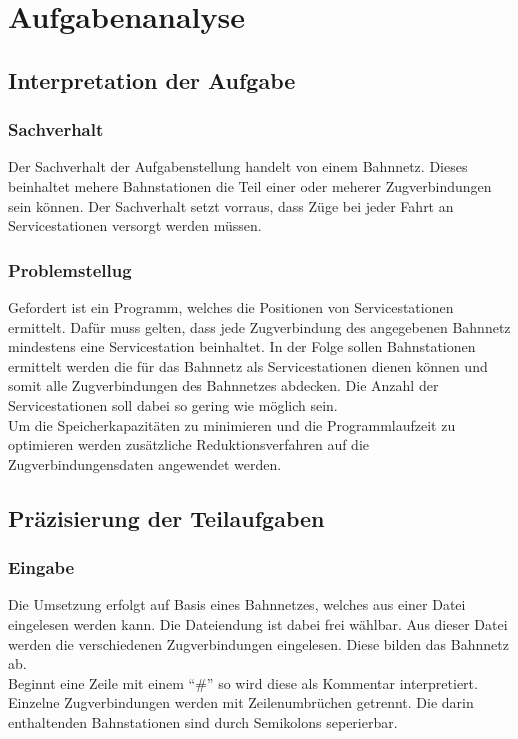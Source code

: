 \chapter{Aufgabenanalyse}\label{ch:aufgabenanalyse}
\section{Interpretation der Aufgabe}\label{auf:sec:interpretation-der-aufgabe}
\subsection{Sachverhalt}\label{auf:subsec:sachverhalt}
Der Sachverhalt der Aufgabenstellung handelt von einem Bahnnetz. Dieses beinhaltet mehere Bahnstationen die Teil einer oder meherer Zugverbindungen sein können. Der Sachverhalt setzt vorraus, dass Züge bei jeder Fahrt an Servicestationen versorgt werden müssen.
\subsection{Problemstellug}\label{auf:subsec:aufgabenstellung}
Gefordert ist ein Programm, welches die Positionen von Servicestationen ermittelt. Dafür muss gelten, dass jede Zugverbindung des angegebenen Bahnnetz mindestens eine Servicestation beinhaltet. In der Folge sollen Bahnstationen ermittelt werden die für das Bahnnetz als Servicestationen dienen können und somit alle Zugverbindungen des Bahnnetzes abdecken. Die Anzahl der Servicestationen soll dabei so gering wie möglich sein.
\\
Um die Speicherkapazitäten zu minimieren und die Programmlaufzeit zu optimieren werden zusätzliche Reduktionsverfahren auf die Zugverbindungensdaten angewendet werden.\\ 

\section{Präzisierung der Teilaufgaben}\label{auf:subsec:teilaufgaben}
\subsection{Eingabe}\label{auf:subsec:eingabe}
Die Umsetzung erfolgt auf Basis eines Bahnnetzes, welches aus einer Datei eingelesen werden kann. Die Dateiendung ist dabei frei wählbar. Aus dieser Datei werden die verschiedenen Zugverbindungen eingelesen. Diese bilden das Bahnnetz ab.\\
Beginnt eine Zeile mit einem \enquote{\#} so wird diese als Kommentar interpretiert. Einzelne Zugverbindungen werden mit Zeilenumbrüchen getrennt. Die darin enthaltenden Bahnstationen sind durch Semikolons seperierbar.\\


